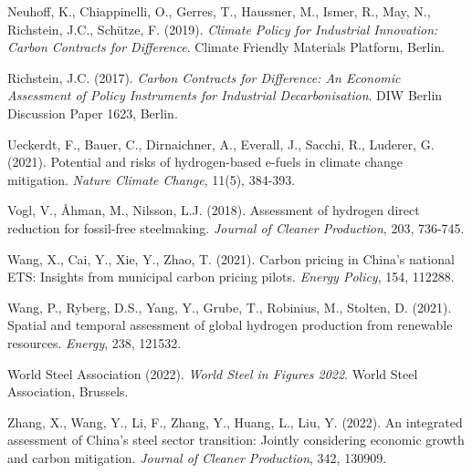 \documentclass[preprint,1p,authoryear]{elsarticle}
\begin{document}
\begin{thebibliography}{99}
 Neuhoff, K., Chiappinelli, O., Gerres, T., Haussner, M., Ismer, R., May, N., Richstein, J.C., Schütze, F. (2019). \textit{Climate Policy for Industrial Innovation: Carbon Contracts for Difference}. Climate Friendly Materials Platform, Berlin.

 Richstein, J.C. (2017). \textit{Carbon Contracts for Difference: An Economic Assessment of Policy Instruments for Industrial Decarbonisation}. DIW Berlin Discussion Paper 1623, Berlin.

 Ueckerdt, F., Bauer, C., Dirnaichner, A., Everall, J., Sacchi, R., Luderer, G. (2021). Potential and risks of hydrogen-based e-fuels in climate change mitigation. \textit{Nature Climate Change}, 11(5), 384-393.

 Vogl, V., Åhman, M., Nilsson, L.J. (2018). Assessment of hydrogen direct reduction for fossil-free steelmaking. \textit{Journal of Cleaner Production}, 203, 736-745.

 Wang, X., Cai, Y., Xie, Y., Zhao, T. (2021). Carbon pricing in China's national ETS: Insights from municipal carbon pricing pilots. \textit{Energy Policy}, 154, 112288.

 Wang, P., Ryberg, D.S., Yang, Y., Grube, T., Robinius, M., Stolten, D. (2021). Spatial and temporal assessment of global hydrogen production from renewable resources. \textit{Energy}, 238, 121532.

 World Steel Association (2022). \textit{World Steel in Figures 2022}. World Steel Association, Brussels.

 Zhang, X., Wang, Y., Li, F., Zhang, Y., Huang, L., Liu, Y. (2022). An integrated assessment of China's steel sector transition: Jointly considering economic growth and carbon mitigation. \textit{Journal of Cleaner Production}, 342, 130909.
\end{thebibliography}
\end{document}
